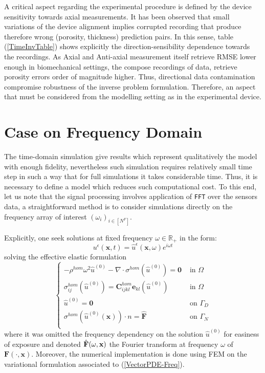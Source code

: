 A critical aspect regarding the experimental procedure is defined by the device sensitivity towards axial measurements. It has been observed that small variations of the device alignment implies corrupted recording that produce therefore wrong (porosity, thickness) prediction pairs.
In this sense, table (\ref{TimeInvTable}) shows explicitly the direction-sensibility dependence towards the recordings. As Axial and Anti-axial measurement itself retrieve RMSE lower enough in biomechanical settings, the compose recordings of data, retrieve porosity errors order of magnitude higher. Thus, directional data contamination compromise robustness of the inverse problem formulation. Therefore, an aspect that must be considered from the modelling setting as in the experimental device.


\section{Case on Frequency Domain}

The time-domain simulation give results which represent qualitatively the model with enough fidelity, nevertheless such simulation requires relatively small time step in such a way that for full simulations it takes considerable time. Thus, it is necessary to define a model which reduces such computational cost.
To this end, let us note that the signal processing involves application of \texttt{FFT} over the sensors data, a straightforward method is to consider simulations directly on the frequency array of interest $(\omega_i)_{i \in [N^F]}$. 

Explicitly, one seek solutions at fixed frequency $\omega \in \mathbb{R}_+$ in the form:
\begin{equation}
    \label{FreqAnsatz}
    u^{\epsilon}(\mathbf{x},t) = \hat{u}^{\epsilon}(\mathbf{x},\omega) e^{i \omega t}
\end{equation}
solving the effective elastic formulation 
\begin{equation}
    \label{VectorPDE-Freq}
    \left \{
    \begin{array}{cc}
        -\rho^{hom} \omega^2 \hat{u}^{(0)} - \nabla \cdot \sigma^{hom} (\hat{u}^{(0)})=\mathbf{0}  & \text{ in }  \Omega \\
        \sigma^{hom}_{ij} (\hat{u}^{(0)}) = \mathbf{C}^{hom}_{ijkl} \mathbf{e}_{kl} (\hat{u}^{(0)}) & \text{ in } \Omega  \\
        \hat{u}^{(0)} = \mathbf{0} & \text{ on } \Gamma_D\\
        \sigma^{hom} (\hat{u}^{(0)}(\mathbf{x}))\cdot n = \hat{\mathbf{F}} & \text{ on } \Gamma_N \\
    \end{array}
    \right .
\end{equation}
where it was omitted the frequency dependency on the solution $\hat{u}^{(0)}$ for easiness of exposure and denoted $\Hat{\mathbf{F}}(\omega, \mathbf{x})$ the Fourier transform at frequency $\omega$ of $\mathbf{F}(\cdot, \mathbf{x})$. Moreover, the numerical implementation is done using FEM on the variational formulation associated to (\ref{VectorPDE-Freq}).

